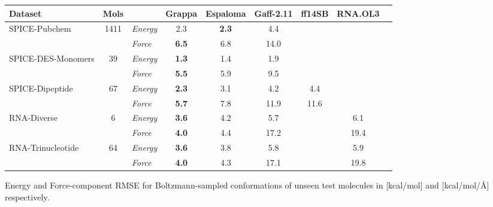 \documentclass[varwidth]{standalone}
\begin{document}
\begin{adjustbox}{width=\textwidth,center}
\centering

\begin{tabular}{l c l c c c c c c}
\hline
\hline
Dataset & Mols & & Grappa & Espaloma & Gaff-2.11 & ff14SB & RNA.OL3 \\
\hline
\multirow{2}{*}{SPICE-Pubchem} & \multirow{2}{*}{1411} & \textit{Energy} & 2.3 & \textbf{2.3} & 4.4 &  &  \\
                             &                    & \textit{Force}  & \textbf{6.5} & 6.8 & 14.0 &  &  \\
\hline
\multirow{2}{*}{SPICE-DES-Monomers} & \multirow{2}{*}{39} & \textit{Energy} & \textbf{1.3} & 1.4 & 1.9 &  &  \\
                             &                    & \textit{Force}  & \textbf{5.5} & 5.9 & 9.5 &  &  \\
\hline
\multirow{2}{*}{SPICE-Dipeptide} & \multirow{2}{*}{67} & \textit{Energy} & \textbf{2.3} & 3.1 & 4.2 & 4.4 &  \\
                             &                    & \textit{Force}  & \textbf{5.7} & 7.8 & 11.9 & 11.6 &  \\
\hline
\multirow{2}{*}{RNA-Diverse} & \multirow{2}{*}{6} & \textit{Energy} & \textbf{3.6} & 4.2 & 5.7 &  & 6.1 \\
                             &                    & \textit{Force}  & \textbf{4.0} & 4.4 & 17.2 &  & 19.4 \\
\hline
\multirow{2}{*}{RNA-Trinucleotide} & \multirow{2}{*}{64} & \textit{Energy} & \textbf{3.6} & 3.8 & 5.8 &  & 5.9 \\
                             &                    & \textit{Force}  & \textbf{4.0} & 4.3 & 17.1 &  & 19.8 \\
\hline
\hline
\hline
\end{tabular}

\end{adjustbox}

\vspace{5pt}
\small
Energy and Force-component RMSE for Boltzmann-sampled conformations of unseen test molecules in [kcal/mol] and [kcal/mol/\AA{}] respectively.
\end{document}
